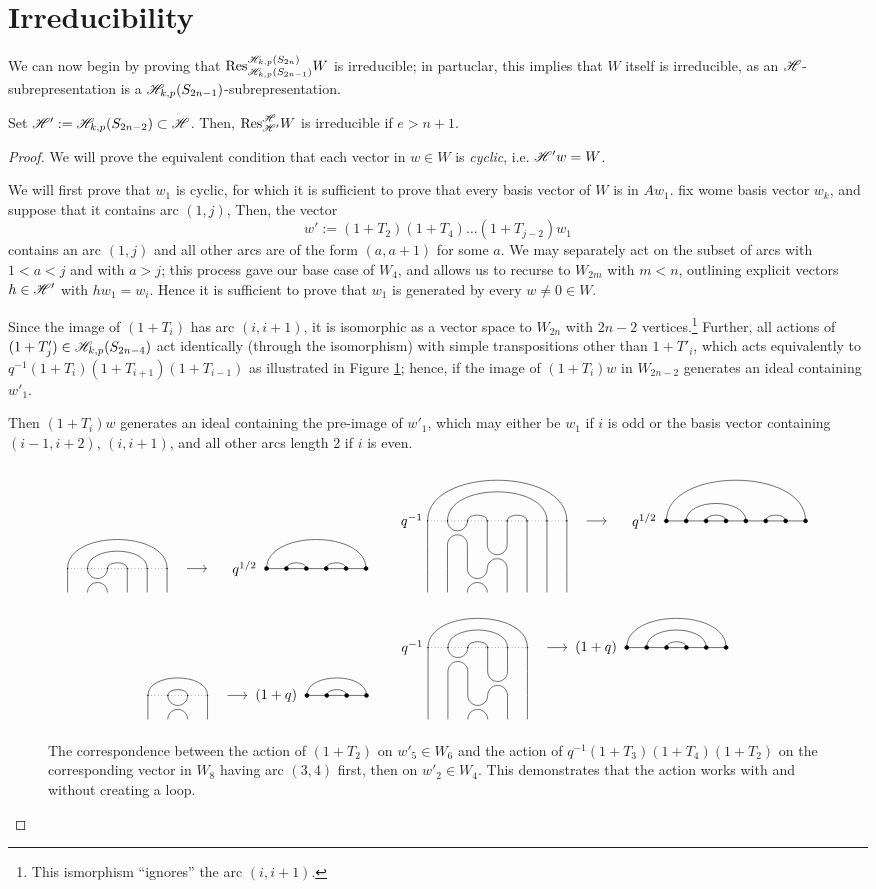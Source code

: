 \documentclass{amsart}
\begin{document}
\section{Irreducibility} 
We can now begin by proving that $\text{Res}_{\mathscr{H}_{k,p}(S_{2n - 1})}^{\mathscr{H}_{k,p}(S_{2n})} W$ is irreducible;
in partuclar, this implies that $W$ itself is irreducible, as an $\mathscr{H}$-subrepresentation is a $\mathscr{H}_{k,p}(S_{2n - 1})$-subrepresentation.
\begin{proposition}
  Set $\mathscr{H}' := \mathscr{H}_{k,p}(S_{2n - 2}) \subset \mathscr{H}$.
  Then, $\text{Res}_{\mathscr{H}'}^{\mathscr{H}} W$ is irreducible if $e > n + 1$.
\end{proposition}
\begin{proof}
  We will prove the equivalent condition that each vector in $w \in W$ is \emph{cyclic}, i.e. $\mathscr{H}' w = W$.

  We will first prove that $w_1$ is cyclic, for which it is sufficient to prove that every basis vector of $W$ is in $Aw_1$.
  fix wome basis vector $w_k$, and suppose that it contains arc $(1,j)$,
  Then, the vector
  \[
    w' := (1 + T_2)(1 + T_4)\dots(1 + T_{j-2})w_1
  \]
  contains an arc $(1,j)$ and all other arcs are of the form $(a,a+1)$ for some $a$.
  We may separately act on the subset of arcs with $1 < a < j$ and with $a > j$;
  this process gave our base case of $W_4$, and allows us to recurse to $W_{2m}$ with $m < n$, outlining explicit vectors $h \in \mathscr{H}'$ with $hw_1 = w_i$.
  Hence it is sufficient to prove that $w_1$ is generated by every $w \neq 0 \in W$.
  
  Since the image of $(1 + T_i)$ has arc $(i,i+1)$, it is isomorphic as a vector space to $W_{2n}$ with $2n - 2$ vertices.\footnote{This ismorphism ``ignores'' the arc $(i,i+1)$.}
  Further, all actions of $(1 + T'_j) \in \mathscr{H}_{k,p}(S_{2n - 4})$ act identically (through the isomorphism) with simple transpositions other than $1 + T'_i$, which acts equivalently to $q^{-1}(1 + T_i)(1 + T_{i + 1})(1 + T_{i - 1})$ as illustrated in Figure \ref{bigloop};
  hence, if the image of $(1 + T_i)w$ in $W_{2n - 2}$ generates an ideal containing $w'_1$.
  
  Then $(1 + T_i)w$ generates an ideal containing the pre-image of $w'_1$, which may either be $w_1$ if $i$ is odd or the basis vector containing $(i-1,i+2)$, $(i,i+1)$, and all other arcs length 2 if $i$ is even.
  \begin{figure}[b]
  \[
    \Action{6}{1/6, 2/5, 3/4}{2}{1/6, 2/3, 4/5 }{q^{1/2}} \hspace{20pt} 
    \IsoAction{8}{1/8, 2/7, 3/4, 5/6}{3}{1/8, 2/5, 3/4, 6/7}{q^{1/2}}
  \]
  \[
    \Action{4}{1/4, 2/3}{2}{1/4,2/3}{(1 + q)} \hspace{20pt}
    \IsoAction{6}{1/6, 2/5, 3/4}{3}{1/6, 2/5, 3/4}{(1 + q)}
  \]
  \caption{The correspondence between the action of $(1 + T_2)$ on $w'_5 \in W_6$ and the action of $q^{-1}(1 + T_3)(1 + T_4)(1 + T_2)$ on the corresponding vector in $W_8$ having arc $(3,4)$ first, then on $w'_2 \in W_4$.
  This demonstrates that the action works with and without creating a loop.
  }
  \label{bigloop}
  \end{figure}


\end{proof}
\end{document}

